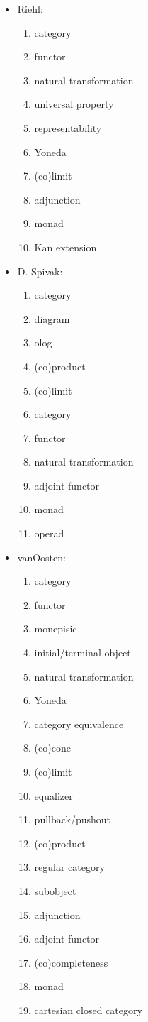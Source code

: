 \documentclass[11pt,openany]{book}
\begin{document}
\begin{itemize}
\item Riehl:~\cite{riehl_2017_cath_in_context}
\begin{enumerate}
  \item category
  \item functor
  \item natural transformation
  \item universal property
  \item representability
  \item Yoneda
  \item (co)limit
  \item adjunction
  \item monad
  \item Kan extension
\end{enumerate}

\item D. Spivak:~\cite{spivakd_2013_cath_for_scientists}
\begin{enumerate}
  \item category
  \item diagram
  \item olog
  \item (co)product
  \item (co)limit
  \item category
  \item functor
  \item natural transformation
  \item adjoint functor
  \item monad
  \item operad
\end{enumerate}

\item vanOosten:\cite{vanoosten_2002}
\begin{enumerate}
  \item category
  \item functor
  \item monepisic
  \item initial/terminal object
  \item natural transformation
  \item Yoneda
  \item category equivalence
  \item (co)cone
  \item (co)limit
  \item equalizer
  \item pullback/pushout
  \item (co)product
  \item regular category
  \item subobject
  \item adjunction
  \item adjoint functor
  \item (co)completeness
  \item monad
  \item cartesian closed category
 \end{enumerate}
\end{itemize}
  
\end{document}
